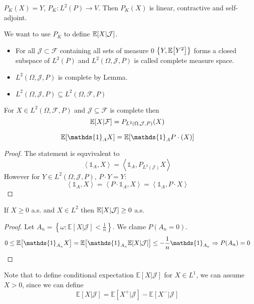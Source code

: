 \begin{definition}
	$P_K(X) = Y$, $P_K: L^2(P) \to V$. Then $P_K(X)$ is linear, contractive and self-adjoint.
\end{definition}

We want to use $P_K$ to define $\mathbb{E}\qty[X|\mathcal{J}]$.
\begin{itemize}
	\item For all $\mathcal{J} \subset \mathcal{F}$ containing all sets of measure $0$ $\left\{ Y, \mathbb{E} \qty[Y^2] \right\}$ forms a closed subspace of $L^2(P)$ and $L^2(\Omega, \mathcal{J}, P)$ is called complete measure space.
	 \item $L^2(\Omega, \mathcal{J}, P)$ is complete by Lemma.
	 \item $L^2(\Omega, \mathcal{J}, P) \subseteq L^2(\Omega, \mathcal{F}, P)$
\end{itemize}

\begin{definition}
	For $X \in L^2(\Omega, \mathcal{F}, P)$ and $\mathcal{J} \subseteq \mathcal{F}$ is complete then
	$$\mathbb{E} \qty[X | \mathcal{F}] = P_{L^2(\Omega,\mathcal{J},P)} (X)$$
\end{definition}

\begin{prop}
	$$\mathbb{E} \qty[\mathds{1}_A X] = \mathbb{E} \qty[\mathds{1}_A P \cdot (X)]$$
	\begin{proof}
		The statement is equvivalent to
		$$\left\langle \mathds{1}_A, X\right\rangle = \left\langle \mathds{1}_A, P_{L^2(\mathcal{J})}X \right\rangle$$
		However for $Y\in L^2(\Omega, \mathcal{J}, P)$, $P\cdot Y= Y$:
		$$\left\langle \mathds{1}_A, X\right\rangle = \left\langle P\cdot \mathds{1}_A, X \right\rangle=\left\langle  \mathds{1}_A,  P\cdot X  \right\rangle$$
	\end{proof}
\end{prop}

\begin{lemma}
	If $X\geq 0$ a.s. and $X\in L^2$ then $\mathbb{E} \qty[X | \mathcal{J}] \geq 0$ a.s.
	\begin{proof}
		Let $A_n = \left\{ \omega : \mathbb{E}[X|\mathcal{J}] <\frac{1}{n} \right\}$. We clame $P(A_n=0)$.
		$$0 \leq \mathbb{E}\qty[\mathds{1}_{A_n} X] =  \mathbb{E}\qty[\mathds{1}_{A_n} \mathbb{E}\qty[X|\mathcal{J}]] \leq -\frac{1}{n} \mathds{1}_{A_n} \Rightarrow P(A_n) = 0 $$
	\end{proof}
\end{lemma}

Note that to define conditional expectation $\mathbb{E}[X|\mathcal{J}]$ for $X\in L^1$, we can assume $X>0$, since we can define 
$$\mathbb{E}[X|\mathcal{J}] = \mathbb{E}[X^+|\mathcal{J}]  - \mathbb{E}[X^-|\mathcal{J}] $$

